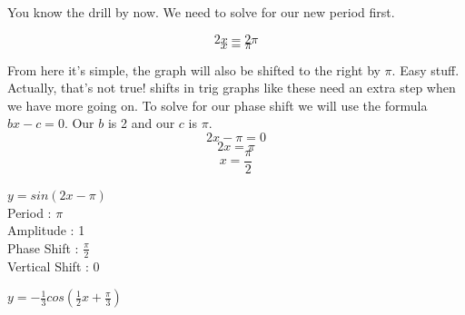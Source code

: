 \documentclass[10pt,letterpaper]{amspset}
\begin{document}
\begin{solution}[Solution]
    You know the drill by now. We need to solve for our new period first.
    
    \[ 2x = 2\pi \]
    \[\boxed{ x = \pi }\]
    
    From here it's simple, the graph will also be shifted to the right by $\pi$. Easy stuff. Actually, that's not true! shifts in trig graphs like these need an extra step when we have more going on. To solve for our phase shift we will use the formula $bx - c = 0$. Our $b$ is 2 and our $c$ is $\pi$.
    \[ 2x - \pi = 0 \]
    \[ 2x = \pi \]
    \[\boxed{ x = \frac{\pi}{2} }\]
    
    
    \noindent $y = sin(2x - \pi)$ \\[+2mm]
    Period : $\pi$ \\[+2mm]
    Amplitude : 1 \\[+2mm]
    Phase Shift : $\frac{\pi}{2}$ \\[+2mm]
    Vertical Shift : 0 \\
   
   
\end{solution}


\pagebreak


\begin{problem}[7]
    $y = -\frac{1}{3} cos (\frac{1}{2}x + \frac{\pi}{3})$
\end{problem}
\end{document}
